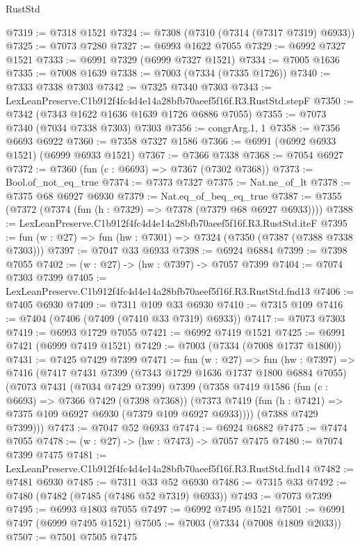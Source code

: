 \begin{lexlean}{RustStd}
\begin{coremodule}
@7319 := @7318 @1521
@7324 := @7308 (@7310 (@7314 (@7317 @7319) @6933))
@7325 := @7073 @7280
@7327 := @6993 @1622 @7055
@7329 := @6992 @7327 @1521
@7333 := @6991 @7329 (@6999 @7327 @1521)
@7334 := @7005 @1636
@7335 := @7008 @1639
@7338 := @7003 (@7334 (@7335 @1726))
@7340 := @7333 @7338 @7303
@7342 := @7325 @7340 @7303
@7343 := LexLeanPreserve.C1b912f4fc4d4e14a28bfb70aeef5f16f.R3.RustStd.stepF
@7350 := @7342 (@7343 @1622 @1636 @1639 @1726 @6886 @7055)
@7355 := @7073 @7340 (@7034 @7338 @7303) @7303
@7356 := congrArg.{1, 1}
@7358 := @7356 @6693 @6922
@7360 := @7358 @7327 @1586
@7366 := @6991 (@6992 @6933 @1521) (@6999 @6933 @1521)
@7367 := @7366 @7338
@7368 := @7054 @6927
@7372 := @7360 (fun (c : @6693) => @7367 (@7302 @7368))
@7373 := Bool.of_not_eq_true
@7374 := @7373 @7327
@7375 := Nat.ne_of_lt
@7378 := @7375 @68 @6927 @6930
@7379 := Nat.eq_of_beq_eq_true
@7387 := @7355 (@7372 (@7374 (fun (h : @7329) => @7378 (@7379 @68 @6927 @6933))))
@7388 := LexLeanPreserve.C1b912f4fc4d4e14a28bfb70aeef5f16f.R3.RustStd.iteF
@7395 := fun (w : @27) => fun (hw : @7301) => @7324 (@7350 (@7387 (@7388 @7338 @7303)))
@7397 := @7047 @33 @6933
@7398 := @6924 @6884
@7399 := @7398 @7055
@7402 := (w : @27) -> (hw : @7397) -> @7057 @7399
@7404 := @7074 @7303 @7399
@7405 := LexLeanPreserve.C1b912f4fc4d4e14a28bfb70aeef5f16f.R3.RustStd.fnd13
@7406 := @7405 @6930
@7409 := @7311 @109 @33 @6930
@7410 := @7315 @109
@7416 := @7404 (@7406 (@7409 (@7410 @33 @7319) @6933))
@7417 := @7073 @7303
@7419 := @6993 @1729 @7055
@7421 := @6992 @7419 @1521
@7425 := @6991 @7421 (@6999 @7419 @1521)
@7429 := @7003 (@7334 (@7008 @1737 @1800))
@7431 := @7425 @7429 @7399
@7471 := fun (w : @27) =>
  fun (hw : @7397) =>
  @7416
    (@7417
      @7431
      @7399
      (@7343 @1729 @1636 @1737 @1800 @6884 @7055)
      (@7073
        @7431
        (@7034 @7429 @7399)
        @7399
        (@7358
          @7419
          @1586
          (fun (c : @6693) => @7366 @7429 (@7398 @7368))
          (@7373 @7419 (fun (h : @7421) => @7375 @109 @6927 @6930 (@7379 @109 @6927 @6933))))
        (@7388 @7429 @7399)))
@7473 := @7047 @52 @6933
@7474 := @6924 @6882
@7475 := @7474 @7055
@7478 := (w : @27) -> (hw : @7473) -> @7057 @7475
@7480 := @7074 @7399 @7475
@7481 := LexLeanPreserve.C1b912f4fc4d4e14a28bfb70aeef5f16f.R3.RustStd.fnd14
@7482 := @7481 @6930
@7485 := @7311 @33 @52 @6930
@7486 := @7315 @33
@7492 := @7480 (@7482 (@7485 (@7486 @52 @7319) @6933))
@7493 := @7073 @7399
@7495 := @6993 @1803 @7055
@7497 := @6992 @7495 @1521
@7501 := @6991 @7497 (@6999 @7495 @1521)
@7505 := @7003 (@7334 (@7008 @1809 @2033))
@7507 := @7501 @7505 @7475

\end{coremodule}
\end{lexlean}
